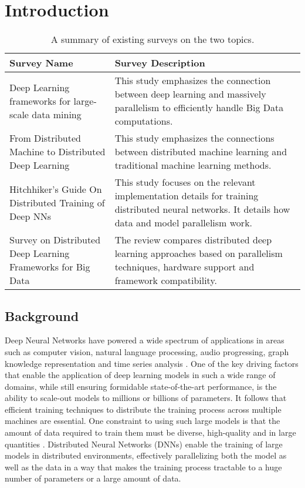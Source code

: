 \section{Introduction}
\label{sec:intro}

\begin{table*}[htbp]
	\centering
	\caption{A summary of existing surveys on the two topics.}
	\label{tab:related_surveys}
	\begin{tabular}{|p{5cm}|p{11cm}|}
		\toprule
		\textbf{Survey Name} & \textbf{Survey Description}  \\
		\midrule
		{\small Deep Learning frameworks for large-scale data mining~\cite{nguyen_machine_2019}} & This study emphasizes the connection between deep learning and massively parallelism to efficiently handle Big Data computations. \\
		\midrule
		{\small From Distributed Machine to Distributed Deep Learning~\cite{dehghani_distributed_2023}} & This study emphasizes the connections between distributed machine learning and traditional machine learning methods.  \\
		\midrule
		{\small Hitchhiker’s Guide On Distributed Training of Deep NNs~\cite{chahal_hitchhikers_2018}} & This study focuses on the relevant implementation details for training distributed neural networks. It details how data and model parallelism work.  \\
		\midrule
		{\small Survey on Distributed Deep Learning Frameworks for Big Data~\cite{berloco_systematic_2022}} & The review compares distributed deep learning approaches based on parallelism techniques, hardware support and framework compatibility.\\
		\bottomrule
	\end{tabular}
\end{table*}
\subsection{Background}
Deep Neural Networks have powered a wide spectrum of applications in areas such as computer vision,
natural language processing, audio progressing, graph knowledge representation and time series
analysis \cite{noauthor_papers_nodate}. One of the key driving factors that enable the application
of deep learning models in such a wide range of domains, while still ensuring formidable
state-of-the-art performance, is the ability to scale-out models to millions or billions of
parameters. It follows that efficient training techniques to distribute the training process across
multiple machines are essential. One constraint to using such large models is that the amount of
data required to train them must be diverse, high-quality and in large quantities
\cite{ben-nun_demystifying_2020, dehghani_distributed_2023, langer_distributed_2020}. Distributed
Neural Networks (DNNs) enable the training of large models in distributed environments, effectively
parallelizing both the model as well as the data in a way that makes the training process tractable
to a huge number of parameters or a large amount of data.

